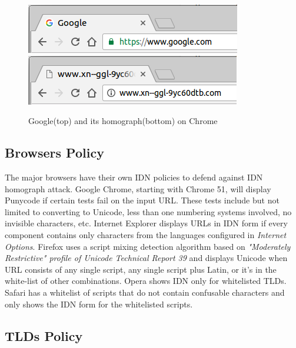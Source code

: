\documentclass[letterpaper,twocolumn,10pt]{article}
\begin{document}
\begin{figure}[t]
  \includegraphics[width=\linewidth]{google.png}
  \includegraphics[width=\linewidth]{fakegoogle.png}
  \centering
  \caption{Google(top) and its homograph(bottom) on Chrome}
  \label{screenshot}
\end{figure}

\subsection{Browsers Policy}
The major browsers have their own IDN policies to defend against IDN homograph attack.
Google Chrome, starting with Chrome 51, will display Punycode if certain tests fail on the input URL.
These tests include but not limited to converting to Unicode, less than one numbering systems involved, no invisible characters, etc.
Internet Explorer displays URLs in IDN form if every component contains only characters from the languages configured in \textit{Internet Options}.
Firefox uses a script mixing detection algorithm based on \textit{"Moderately Restrictive" profile of Unicode Technical Report 39} and displays Unicode when URL consists of any single script, any single script plus Latin, or it's in the white-list of other combinations.
Opera shows IDN only for whitelisted TLDs.
Safari has a whitelist of scripts that do not contain confusable characters and only shows the IDN form for the whitelisted scripts.

\subsection{TLDs Policy}
\end{document}
